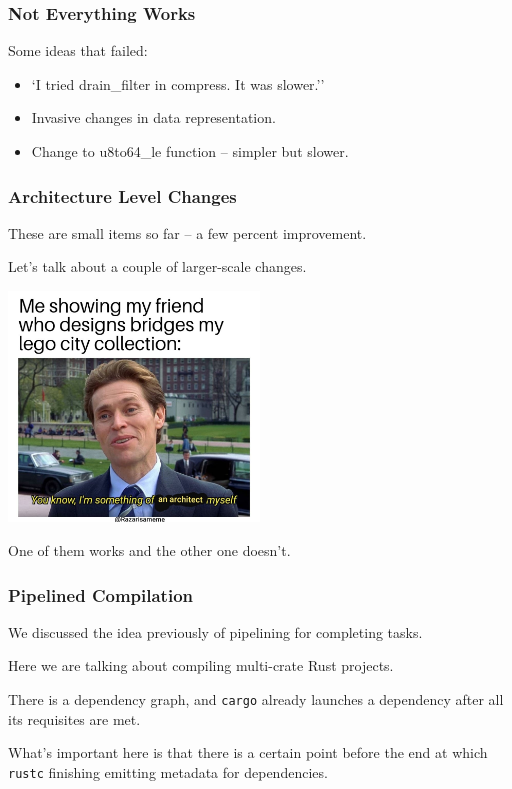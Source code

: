 \begin{frame}
\frametitle{Not Everything Works}

Some ideas that failed:

\begin{itemize}
	\item `I tried drain\_filter in compress. It was slower.''
	\item Invasive changes in data representation.
	\item Change to u8to64\_le function -- simpler but slower.
\end{itemize}

\end{frame}


\begin{frame}
\frametitle{Architecture Level Changes}
These are small items so far -- a few percent improvement.

Let's talk about a couple of larger-scale changes. 

\begin{center}
	\includegraphics[width=0.5\textwidth]{images/architect.jpeg}
\end{center}

One of them works
and the other one doesn't.

\end{frame}


\begin{frame}
\frametitle{Pipelined Compilation}

We discussed the idea previously of pipelining for completing tasks.

Here we are talking about compiling multi-crate Rust projects. 

There is a dependency graph, and \texttt{cargo} already launches a dependency after all its requisites are met.

What's important here is that there is a certain point before the end at which \texttt{rustc}
finishing emitting
metadata for dependencies.

\end{frame}



